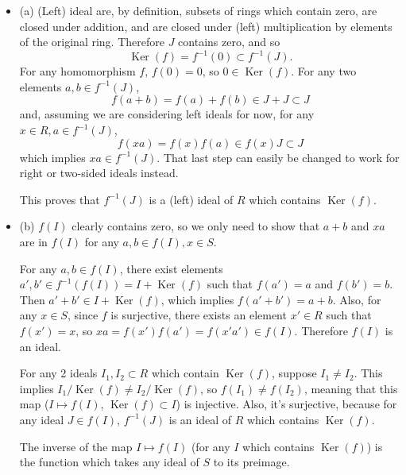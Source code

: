 \documentclass[12pt]{article}
\begin{document}
\begin{itemize}
    \item (a) (Left) ideal are, by definition, subsets of rings which contain zero, are closed under addition, and are closed under (left) multiplication by elements of the original ring. Therefore $J$ contains zero, and so
        \[ \operatorname{Ker}(f) = f^{-1}(0) \subset f^{-1}(J). \]
        For any homomorphism $f$, $f(0)=0$, so $0 \in \operatorname{Ker}(f)$. For any two elements $a, b \in f^{-1}(J)$,
        \[ f(a+b)=f(a)+f(b)\in J+J \subset J \]
        and, assuming we are considering left ideals for now, for any $x \in R, a \in f^{-1}(J)$,
        \[ f(xa) = f(x)f(a) \in f(x) J \subset J \]
        which implies $xa \in f^{-1}(J)$. That last step can easily be changed to work for right or two-sided ideals instead.
        \par
        This proves that $f^{-1}(J)$ is a (left) ideal of $R$ which contains $\operatorname{Ker}(f)$.
    \item (b) $f(I)$ clearly contains zero, so we only need to show that $a+b$ and $xa$ are in $f(I)$ for any $a,b \in f(I), x \in S$.
        \par
        For any $a, b \in f(I)$, there exist elements $a', b' \in f^{-1}(f(I))= I + \operatorname{Ker}(f)$ such that $f(a')=a$ and $f(b')=b$. Then $a' + b' \in I + \operatorname{Ker}(f)$, which implies $f(a'+b')=a+b$. Also, for any $x \in S$, since $f$ is surjective, there exists an element $x' \in R$ such that $f(x')=x$, so $xa=f(x')f(a')=f(x'a') \in f(I)$. Therefore $f(I)$ is an ideal.
        \par
        For any 2 ideals $I_1, I_2 \subset R$ which contain $\operatorname{Ker}(f)$, suppose $I_1 \neq I_2$. This implies $I_1 / \operatorname{Ker}(f) \neq I_2 / \operatorname{Ker}(f)$, so $f(I_1) \neq f(I_2)$, meaning that this map ($I \mapsto f(I)$, $\operatorname{Ker}(f) \subset I$) is injective. Also, it's surjective, because for any ideal $J \in f(I)$, $f^{-1}(J)$ is an ideal of $R$ which contains $\operatorname{Ker}(f)$.
        \par
        The inverse of the map $I \mapsto f(I)$ (for any $I$ which contains $\operatorname{Ker}(f)$) is the function which takes any ideal of $S$ to its preimage.
\end{itemize}
\end{document}
